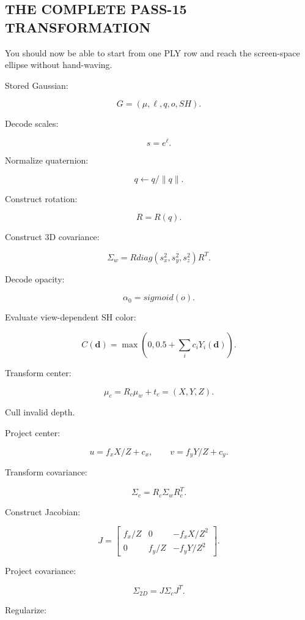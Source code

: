 \subsection{THE COMPLETE PASS-15 TRANSFORMATION}\label{04-visual-computing-ii-ch038-the-complete-pass-15-transformation}

\hypertarget{04-visual-computing-ii-ch038-the-complete-pass-15-transformation}{}

You should now be able to start from one PLY row and reach the screen-space ellipse without hand-waving.

Stored Gaussian:

\[
\boxed{
G=
(
\mu,
\ell,
q,
o,
SH
).
}
\]

Decode scales:

\[
\boxed{
s=e^\ell.
}
\]

Normalize quaternion:

\[
\boxed{
q\leftarrow
q/\|q\|.
}
\]

Construct rotation:

\[
R=R(q).
\]

Construct 3D covariance:

\[
\boxed{
\Sigma_w
=
R
diag(s_x^2,s_y^2,s_z^2)
R^T.
}
\]

Decode opacity:

\[
\boxed{
\alpha_0=
sigmoid(o).
}
\]

Evaluate view-dependent SH color:

\[
\boxed{
C(\mathbf d)
=
\max
\left(
0,
0.5+
\sum_i
c_iY_i(\mathbf d)
\right).
}
\]

Transform center:

\[
\boxed{
\mu_c=
R_c\mu_w+t_c
=
(X,Y,Z).
}
\]

Cull invalid depth.

Project center:

\[
\boxed{
u=
f_xX/Z+c_x,
\qquad
v=
f_yY/Z+c_y.
}
\]

Transform covariance:

\[
\boxed{
\Sigma_c=
R_c\Sigma_wR_c^T.
}
\]

Construct Jacobian:

\[
\boxed{
J=
\begin{bmatrix}
f_x/Z&0&-f_xX/Z^2\\
0&f_y/Z&-f_yY/Z^2
\end{bmatrix}.
}
\]

Project covariance:

\[
\boxed{
\Sigma_{2D}
=
J\Sigma_cJ^T.
}
\]

Regularize:


